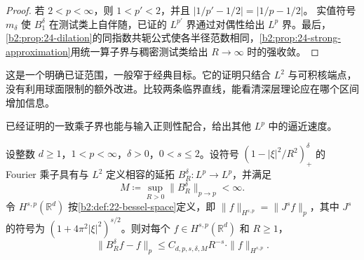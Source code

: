 \begin{proof}
若 \(2<p<\infty\)，则 \(1<p'<2\)，并且
\(|1/p'-1/2|=|1/p-1/2|\)。
实值符号 \(m_\delta\) 使 \(B_1^\delta\) 在测试类上自伴随，已证的 \(L^{p'}\) 界通过对偶性给出 \(L^p\) 界。最后，\cref{b2:prop:24-dilation}的同指数共轭公式使各半径范数相同，\cref{b2:prop:24-strong-approximation}用统一算子界与稠密测试类给出 \(R\to\infty\) 时的强收敛。
\end{proof}
这是一个明确已证范围，一般窄于经典目标。它的证明只结合 \(L^2\) 与可积核端点，没有利用球面限制的额外改进。比较两条临界直线，能看清深层理论应在哪个区间增加信息。

\ProseParagraphBreak
已经证明的一致乘子界也能与输入正则性配合，给出其他 \(L^p\) 中的逼近速度。
\begin{proposition}\label{b2:prop:24-lp-rate}
设整数 \(d\geq1\)，\(1<p<\infty\)，\(\delta>0\)，\(0<s\leq2\)。设符号 \((1-|\xi|^2/R^2)_+^\delta\) 的 Fourier 乘子具有与 \(L^2\) 定义相容的延拓 \(B_R^\delta:L^p\to L^p\)，并满足
\[
 M\coloneqq\sup_{R>0}\|B_R^\delta\|_{p\to p}<\infty.
\]
令 \(H^{s,p}(\mathbb R^d)\) 按\cref{b2:def:22-bessel-space}定义，即
\(\|f\|_{H^{s,p}}=\|J^sf\|_p\)，其中 \(J^s\) 的符号为
\((1+4\pi^2|\xi|^2)^{s/2}\)。则对每个 \(f\in H^{s,p}(\mathbb R^d)\) 和 \(R\geq1\)，
\[
 \|B_R^\delta f-f\|_p
 \leq C_{d,p,s,\delta,M}R^{-s}\cdot\|f\|_{H^{s,p}}.
\]
\end{proposition}
